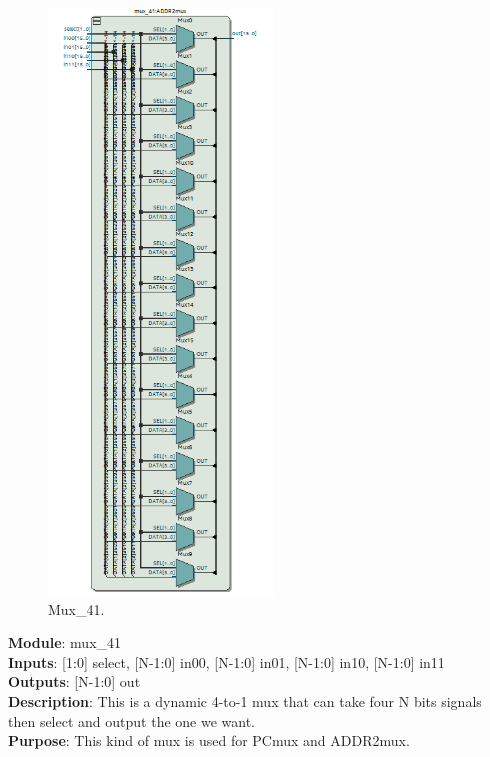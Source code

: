 \documentclass[12pt]{article}
\begin{document}
\begin{figure}[H]
    \centering
    \includegraphics[width=6cm]{mux41.png}
    \caption{Mux\_41.}
\end{figure}
\textbf{Module}: mux\_41 \\ 
\textbf{Inputs}: [1:0] select, [N-1:0] in00, [N-1:0] in01, [N-1:0] in10, [N-1:0] in11 \\ 
\textbf{Outputs}: [N-1:0] out\\ 
\textbf{Description}: This is a dynamic 4-to-1 mux that can take four N bits signals then select and output the one we want. \\ 
\textbf{Purpose}: This kind of mux is used for PCmux and ADDR2mux. \\
\end{document}
